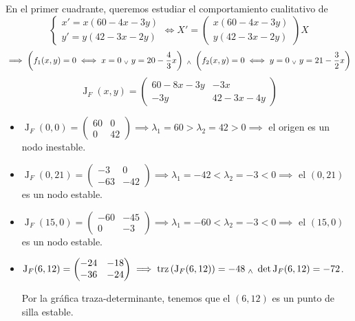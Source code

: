 \begin{ejem}
	En el primer cuadrante, queremos estudiar el comportamiento cualitativo de
	\[\begin{cases}
			x' = x(60-4x-3y) \\y ' = y (42 - 3x-2y)
		\end{cases}\iff X' = \begin{pmatrix}
			x(60-4x-3y) \\y (42-3x-2y)
		\end{pmatrix} X\]
	\[\implies \left(f_1 (x,y) = 0 \iff x = 0 \; _{\vee} \; y = 20 - \frac{4}{3}x \right) \; _{\wedge} \; \left(f_2 (x,y) = 0 \iff y = 0 \; _{\vee} \; y = 21 - \frac{3}{2}x \right)\]
	\[\operatorname{J}_F(x,y) = \begin{pmatrix}
			60 - 8x - 3y & -3x          \\
			-3y          & 42 - 3x - 4y
		\end{pmatrix}\]
	\begin{itemize}
		\item $\operatorname{J}_F(0,0) = \begin{pmatrix}
				      60 & 0  \\
				      0  & 42
			      \end{pmatrix} \implies \lambda_1 = 60 > \lambda_2 = 42 > 0 \implies$ el origen es un nodo inestable.
		\item $\operatorname{J}_F(0, 21) = \begin{pmatrix}
				      -3  & 0   \\
				      -63 & -42
			      \end{pmatrix} \implies \lambda_1 = -42 < \lambda_2 = -3 < 0 \implies$ el $(0, 21)$ es un nodo estable.
		\item $\operatorname{J}_F(15, 0) = \begin{pmatrix}
				      -60 & -45 \\
				      0   & -3
			      \end{pmatrix} \implies \lambda_1 = -60 < \lambda_2 = -3 < 0 \implies$ el $(15, 0)$ es un nodo estable.
		\item $\operatorname{J}_F(6, 12) = \begin{pmatrix}
				      -24 & -18 \\
				      -36 & -24
			      \end{pmatrix} \implies \operatorname{trz}\left(\operatorname{J}_F(6, 12)\right) = -48 \; _{\wedge} \; \det{\operatorname{J}_F(6, 12)} = -72$.

		      Por la gráfica traza-determinante, tenemos que el $(6, 12)$ es un punto de silla estable.
	\end{itemize}
\end{ejem}

